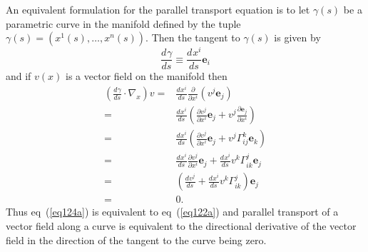 \documentclass[12pt]{report}
\newcommand{\bm}[1]{\boldsymbol{#1}}
\newcommand{\bfrac}[2]{\displaystyle\frac{#1}{#2}}
\newcommand{\lp}{\left (}
\newcommand{\rp}{\right )}
\newcommand{\pdiff}[2]{\bfrac{\partial {#1}}{\partial {#2}}}
\newcommand{\f}[2]{{#1}\lp {#2} \rp}
\newcommand{\paren}[1]{\lp {#1} \rp}
\newcommand{\deriv}[3]{\bfrac{d^{#3}#1}{d{#2}^{#3}}}
\newcommand{\be}{\begin{equation}}
\newcommand{\ee}{\end{equation}}
\newcommand{\eb}{\bm{e}}
\begin{document}
An equivalent formulation for the parallel transport equation is to let $\f{\gamma}{s}$ be a parametric curve in the manifold
defined by the tuple $\f{\gamma}{s} = \paren{\f{x^{1}}{s},\dots,\f{x^{n}}{s}}$.  Then the tangent to $\f{\gamma}{s}$ is given by
\be
	\deriv{\gamma}{s}{} \equiv \deriv{x^{i}}{s}{}\eb_{i}
\ee
and if $\f{v}{x}$ is a vector field on the manifold then
\begin{align}
	\paren{\deriv{\gamma}{s}{}\cdot\nabla_{x}}v =& \deriv{x^{i}}{s}{}\pdiff{}{x^{i}}\paren{v^{j}\eb_{j}} \nonumber \\
	     =&\deriv{x^{i}}{s}{}\paren{\pdiff{v^{j}}{x^{i}}\eb_{j}+v^{j}\pdiff{\eb_{j}}{x^{i}}} \nonumber \\
	     =&\deriv{x^{i}}{s}{}\paren{\pdiff{v^{j}}{x^{i}}\eb_{j}+v^{j}\Gamma^{k}_{ij}\eb_{k}} \nonumber \\
	     =&\deriv{x^{i}}{s}{}\pdiff{v^{j}}{x^{i}}\eb_{j}+\deriv{x^{i}}{s}{}v^{k}\Gamma^{j}_{ik}\eb_{j} \nonumber \\
	     =&\paren{\deriv{v^{j}}{s}{}+\deriv{x^{i}}{s}{}v^{k}\Gamma^{j}_{ik}}\eb_{j} \nonumber \\
	     =& 0. \label{eq124a}
\end{align}
Thus eq~(\ref{eq124a}) is equivalent to eq~(\ref{eq122a}) and parallel transport of a vector field along a curve is 
equivalent to the directional derivative of the vector field in the direction of the tangent to the curve being zero.  
\end{document}

